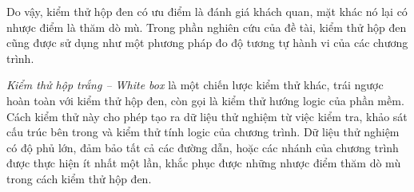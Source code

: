 Do vậy, kiểm thử hộp đen có ưu điểm là đánh giá khách quan, mặt khác
nó lại có nhược điểm là thăm dò mù. Trong phần nghiên cứu của đề tài,
kiểm thử hộp đen cũng được sử dụng như một phương pháp đo độ tương tự
hành vi của các chương trình.
		
\emph{Kiểm thử hộp trắng – White box} là một chiến lược kiểm thử khác,
trái ngược hoàn toàn với kiểm thử hộp đen, còn gọi là kiểm thử hướng
logic của phần mềm. Cách kiểm thử này cho phép tạo ra dữ liệu thử
nghiệm từ việc kiểm tra, khảo sát cấu trúc bên trong và kiểm thử tính
logic của chương trình. Dữ liệu thử nghiệm có độ phủ lớn, đảm bảo tất
cả các đường dẫn, hoặc các nhánh của chương trình được thực hiện ít
nhất một lần, khắc phục được những nhược điểm thăm dò mù trong cách
kiểm thử hộp đen.
			
	



